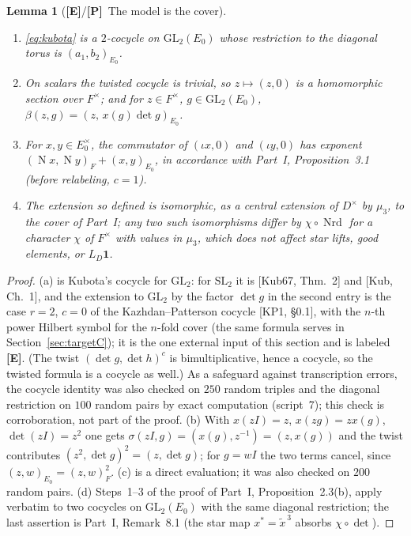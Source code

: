 \documentclass[11pt]{article}
\newcommand{\Nm}{\operatorname N}
\newcommand{\Nrd}{\operatorname{Nrd}}
\newcommand{\Ptag}{\textnormal{\textbf{[P]}}}
\newcommand{\Etag}{\textnormal{\textbf{[E]}}}
\theoremstyle{plain}
\newtheorem{lemma}[theorem]{Lemma}
\theoremstyle{definition}
\begin{document}
\begin{lemma}[\Etag/\Ptag\ The model is the cover]\label{lem:model}
\begin{enumerate}[label=(\alph*)]
\item \eqref{eq:kubota} is a $2$-cocycle on $\mathrm{GL}_2(E_0)$ whose
restriction to the diagonal torus is $(a_1,b_2)_{E_0}$.
\item On scalars the twisted cocycle is trivial, so $z\mapsto(z,0)$ is a
homomorphic section over $F^\times$; and for $z\in F^\times$, $g\in\mathrm{GL}_2(E_0)$,
$\beta(z,g)=(z,\,x(g)\det g)_{E_0}$.
\item For $x,y\in E_0^\times$, the commutator of $(\iota x,0)$ and
$(\iota y,0)$ has exponent $(\Nm x,\Nm y)_F+(x,y)_{E_0}$, in accordance
with Part~I, Proposition~3.1 (before relabeling, $c=1$).
\item The extension so defined is isomorphic, as a central extension of
$D^\times$ by $\mu_3$, to the cover of Part~I; any two such isomorphisms
differ by $\chi\circ\Nrd$ for a character $\chi$ of $F^\times$ with
values in $\mu_3$, which does not affect star lifts, good elements, or
$L_D\mathbf1$.
\end{enumerate}
\end{lemma}
\begin{proof}
(a) is Kubota's cocycle for $\mathrm{GL}_2$: for $\mathrm{SL}_2$ it is
[Kub67, Thm.~2] and [Kub, Ch.~1], and the extension to $\mathrm{GL}_2$ by
the factor $\det g$ in the second entry is the case $r=2$, $c=0$ of the
Kazhdan--Patterson cocycle [KP1, \S0.1], with the $n$-th power Hilbert
symbol for the $n$-fold cover (the same formula serves in
Section~\ref{sec:targetC}); it is the one external input of this section
and is labeled \Etag.  (The twist $(\det g,\det h)^{c}$ is
bimultiplicative, hence a cocycle, so the twisted formula is a cocycle
as well.)  As a safeguard against transcription errors, the cocycle
identity was also checked on $250$ random triples and the diagonal
restriction on $100$ random pairs by exact computation (script~7); this
check is corroboration, not part of the proof.  (b) With $x(zI)=z$, $x(zg)=zx(g)$, $\det(zI)=z^2$ one gets
$\sigma(zI,g)=(x(g),z^{-1})=(z,x(g))$ and the twist contributes
$(z^2,\det g)^2=(z,\det g)$; for $g=wI$ the two terms cancel, since
$(z,w)_{E_0}=(z,w)_F^2$.  (c) is a direct evaluation; it was also
checked on $200$ random pairs.  (d) Steps~1--3 of the proof of Part~I,
Proposition~2.3(b), apply verbatim to two cocycles on $\mathrm{GL}_2(E_0)$
with the same diagonal restriction; the last assertion is Part~I,
Remark~8.1 (the star map $x^*=\tilde x^{\,3}$ absorbs $\chi\circ\det$).
\end{proof}
\end{document}
